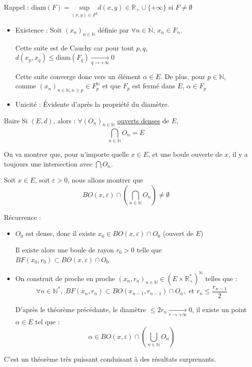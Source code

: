 \begin{myproof}{}{}
  Rappel : $\mathrm{diam}(F) = \underset{(x,y) \in F ^{2} }{\mathrm{sup}} d(x, y) \in \mathbb{R} _ + \cup \{+ \infty\}$ si $F \ne \emptyset$
\begin{itemize}

    \item Existence : 
Soit $(x_n) _{n \in \mathbb{N}}$ définie par $\forall n \in \mathbb{N}$, $x_n \in F_n$. 

Cette suite est de Cauchy car pour tout $p, q$, $d(x_p,x_q) \le \mathrm{diam}(F_q)  \underset{q \to + \infty}{\longrightarrow} 0$

Cette suite converge donc vers un élément $\alpha \in E$. De plus, pour $p \in \mathbb{N}$, comme $(x_n) _{n \in \mathbb{N}, n \ge p } \in F_p ^{\mathbb{N}}$ et que $F_p$ est fermé dans $E$, $\alpha \in F_p$

\item Unicité : Évidente d'après la propriété du diamètre.

\end{itemize}
\end{myproof}



\begin{Theorem}{Baire}{}
Si $(E,d)$, alors : $\forall (O_n) _{n \in \mathbb{N}}$ \underline{ouverts denses} de $E$, $$\overline{ \bigcap _{n \in \mathbb{N} }O_n} = E$$
\end{Theorem}

\begin{myproof}{}{}
On va montrer que, pour n'importe quelle $x \in E$, et une boule ouverte de $x$, il y a toujours une intersection avec $\bigcap O_n$. 

Soit $x \in E$, soit $\varepsilon >0$, nous allons montrer que 
\[
  BO(x, \varepsilon) \cap \left(\bigcap _{n\in \mathbb{N}} O_n\right) \ne \emptyset
\]

Récurrence : 
\begin{itemize}

    \item $O_0$ est dense, donc il existe $x_0 \in BO(x, \varepsilon) \cap O_0$ (ouvert de $E$)

      Il existe alors une boule de rayon $r_0>0$ telle que $BF(x_0, r_0) \subset BO(x, \varepsilon) \cap O_0$

    \item On construit de proche en proche $(x_n, r_n) _{n \in \mathbb{N}} \in (E \times \mathbb{R} _+ ^{*}) ^{\mathbb{N}}$ telles que : 
      \[
        \forall n \in \mathbb{N} ^{*}, \; BF(x_n, r_n) \subset BO(x _{n-1}, r _{n-1}) \cap O_n, \text{ et }  r_n \le \frac{r _{n-1}}{2}
      \]

    D'après le théorème précédante, le diamètre $\le 2r_n  \underset{r \to + \infty}{\longrightarrow} 0$, il existe un point $\alpha \in E$ tel que :
    \[
      \alpha \in BO(x, \varepsilon) \cap \left( \bigcup _{n\in \mathbb{N}} O_n \right)
    \]

\end{itemize}
\end{myproof}
C'est un théorème très puissant conduisant à des résultats surprenants. 



